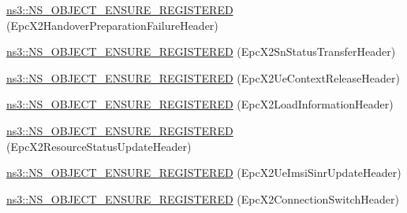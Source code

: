 \begin{DoxyCompactItemize}
\item 
\hyperlink{namespacens3_aa22657b9153eafa356047d8a410c9156}{ns3\+::\+N\+S\+\_\+\+O\+B\+J\+E\+C\+T\+\_\+\+E\+N\+S\+U\+R\+E\+\_\+\+R\+E\+G\+I\+S\+T\+E\+R\+ED} (Epc\+X2\+Handover\+Preparation\+Failure\+Header)
\item 
\hyperlink{namespacens3_ae972a3a387987f08bd10f64eb5fedb05}{ns3\+::\+N\+S\+\_\+\+O\+B\+J\+E\+C\+T\+\_\+\+E\+N\+S\+U\+R\+E\+\_\+\+R\+E\+G\+I\+S\+T\+E\+R\+ED} (Epc\+X2\+Sn\+Status\+Transfer\+Header)
\item 
\hyperlink{namespacens3_ad2db65b4a19ec73f768a3c5be01b9791}{ns3\+::\+N\+S\+\_\+\+O\+B\+J\+E\+C\+T\+\_\+\+E\+N\+S\+U\+R\+E\+\_\+\+R\+E\+G\+I\+S\+T\+E\+R\+ED} (Epc\+X2\+Ue\+Context\+Release\+Header)
\item 
\hyperlink{namespacens3_a893fed337c24e0a309a478d02fe20101}{ns3\+::\+N\+S\+\_\+\+O\+B\+J\+E\+C\+T\+\_\+\+E\+N\+S\+U\+R\+E\+\_\+\+R\+E\+G\+I\+S\+T\+E\+R\+ED} (Epc\+X2\+Load\+Information\+Header)
\item 
\hyperlink{namespacens3_a239968f5ff2219e398bc063c3dd029d9}{ns3\+::\+N\+S\+\_\+\+O\+B\+J\+E\+C\+T\+\_\+\+E\+N\+S\+U\+R\+E\+\_\+\+R\+E\+G\+I\+S\+T\+E\+R\+ED} (Epc\+X2\+Resource\+Status\+Update\+Header)
\item 
\hyperlink{namespacens3_aa5c232dcb291b9755bcf505cc2858986}{ns3\+::\+N\+S\+\_\+\+O\+B\+J\+E\+C\+T\+\_\+\+E\+N\+S\+U\+R\+E\+\_\+\+R\+E\+G\+I\+S\+T\+E\+R\+ED} (Epc\+X2\+Ue\+Imsi\+Sinr\+Update\+Header)
\item 
\hyperlink{namespacens3_a6e9f2cd7ed17fe4f7fe98671599495e0}{ns3\+::\+N\+S\+\_\+\+O\+B\+J\+E\+C\+T\+\_\+\+E\+N\+S\+U\+R\+E\+\_\+\+R\+E\+G\+I\+S\+T\+E\+R\+ED} (Epc\+X2\+Connection\+Switch\+Header)
\end{DoxyCompactItemize}
